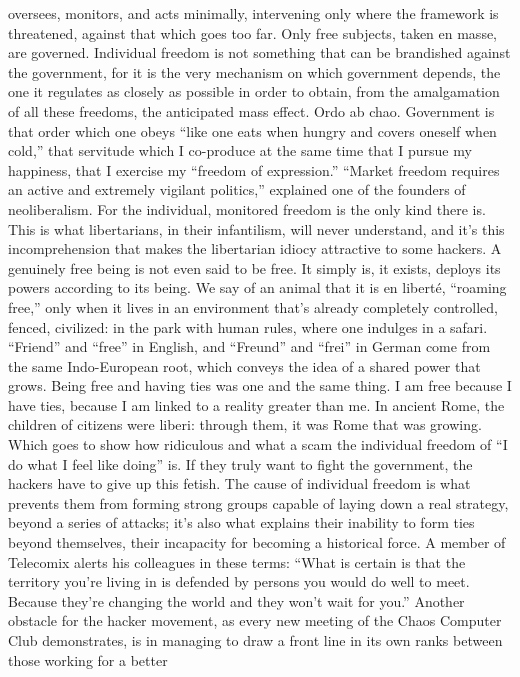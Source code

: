\documentclass[landscape,twocolumn,letterpaper]{article}
\begin{document}
oversees, monitors, and acts minimally, intervening only where the
framework is threatened, against that which goes too far. Only free
subjects, taken en masse, are governed. Individual freedom is not
something that can be brandished against the government, for it is the
very mechanism on which government depends, the one it regulates as
closely as possible in order to obtain, from the amalgamation of all
these freedoms, the anticipated mass effect. Ordo ab chao. Government
is that order which one obeys “like one eats when hungry and covers
oneself when cold,” that servitude which I co-produce at the same time
that I pursue my happiness, that I exercise my “freedom of
expression.” “Market freedom requires an active and extremely vigilant
politics,” explained one of the founders of neoliberalism. For the
individual, monitored freedom is the only kind there is. This is what
libertarians, in their infantilism, will never understand, and it’s
this incomprehension that makes the libertarian idiocy attractive to
some hackers. A genuinely free being is not even said to be free. It
simply is, it exists, deploys its powers according to its being. We
say of an animal that it is en liberté, “roaming free,” only when it
lives in an environment that’s already completely controlled, fenced,
civilized: in the park with human rules, where one indulges in a
safari. “Friend” and “free” in English, and “Freund” and “frei” in
German come from the same Indo-European root, which conveys the idea
of a shared power that grows. Being free and having ties was one and
the same thing. I am free because I have ties, because I am linked to
a reality greater than me. In ancient Rome, the children of citizens
were liberi: through them, it was Rome that was growing. Which goes
to show how ridiculous and what a scam the individual freedom of “I do
what I feel like doing” is. If they truly want to fight the
government, the hackers have to give up this fetish. The cause of
individual freedom is what prevents them from forming strong groups
capable of laying down a real strategy, beyond a series of attacks;
it’s also what explains their inability to form ties beyond
themselves, their incapacity for becoming a historical force. A member
of Telecomix alerts his colleagues in these terms: “What is certain is
that the territory you’re living in is defended by persons you would
do well to meet. Because they’re changing the world and they won’t
wait for you.” Another obstacle for the hacker movement, as every new
meeting of the Chaos Computer Club demonstrates, is in managing to
draw a front line in its own ranks between those working for a better
\end{document}
